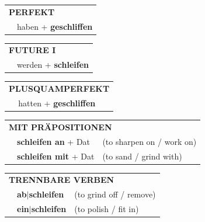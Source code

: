 \documentclass[10pt,a4paper]{revtex4-2}
\begin{document}
\begin{verbbox}
 \begin{tabular}{rl}
     \multicolumn{2}{l}{\textbf{PERFEKT}}\\
   & haben + \textbf{geschliffen}\\
  \end{tabular}
\hfill
\begin{tabular}{rl}
    \multicolumn{2}{l}{\textbf{FUTURE I}}\\
   & werden + \textbf{schleifen}\\
  \end{tabular}
\hfill
\begin{tabular}{rl}
    \multicolumn{2}{l}{\textbf{PLUSQUAMPERFEKT}}\\
   & hatten + \textbf{geschliffen}\\
  \end{tabular}

 \vspace{10pt}

\begin{tabular}{lll}
      \multicolumn{3}{l}{\textbf{MIT PRÄPOSITIONEN}}\\
& \textbf{schleifen an} + Dat & (to sharpen on / work on)\\
& \textbf{schleifen mit} + Dat & (to sand / grind with)\\
\end{tabular}
  \hfill
\begin{tabular}{lll}
      \multicolumn{3}{l}{\textbf{TRENNBARE VERBEN}}\\
 & \textbf{ab$|$schleifen} & (to grind off / remove)\\
 & \textbf{ein$|$schleifen} & (to polish / fit in)\\
  \end{tabular}


\vspace{-5pt}
\end{verbbox}
\end{document}
